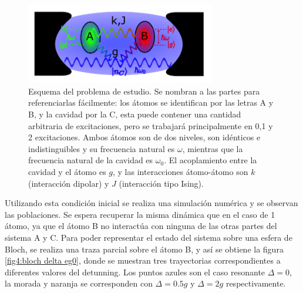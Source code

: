 \begin{figure}[h]
    \centering
    \includegraphics[width=0.74\textwidth]{figuras/ch4/esquema.pdf}
    \caption{Esquema del problema de estudio. Se nombran a las partes para referenciarlas fácilmente: los átomos se identifican por las letras A y B, y la cavidad por la C, esta puede contener una cantidad arbitraria de excitaciones, pero se trabajará principalmente en 0,1 y 2 excitaciones. Ambos átomos son de dos niveles, son idénticos e indistinguibles y su frecuencia natural es $\omega$, mientras que la frecuencia natural de la cavidad es $\omega_0$. El acoplamiento entre la cavidad y el átomo es $g$, y las interacciones átomo-átomo son $k$ (interacción dipolar) y $J$ (interacción tipo Ising).}
    \label{fig4:diagrama esquematico}
\end{figure}
Utilizando esta condición inicial se realiza una simulación numérica y se observan las poblaciones. Se espera recuperar la misma dinámica que en el caso de 1 átomo, ya que el átomo B no interactúa con ninguna de las otras partes del sistema A y C. Para poder representar el estado del sistema sobre una esfera de Bloch, se realiza una traza parcial sobre el átomo B, y así se obtiene la figura \ref{fig4:bloch delta eg0}, donde se muestran tres trayectorias correspondientes a diferentes valores del detunning. Los puntos azules son el caso resonante $\Delta=0$, la morada y naranja se corresponden con $\Delta=0.5g$ y $\Delta=2g$ respectivamente.
